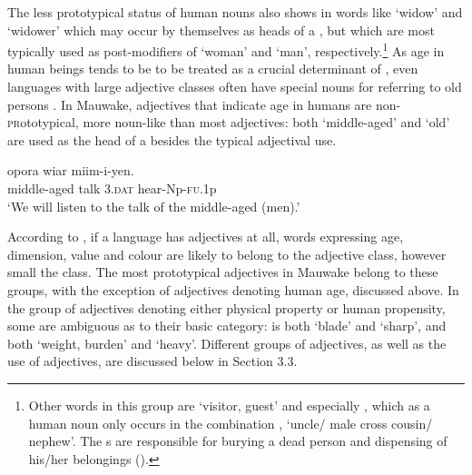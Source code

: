 The less prototypical status of human nouns also shows in words like  `widow' and  `widower' which may occur by themselves as heads of a , but which are most typically used as post-modifiers of  `woman' and  `man', respectively.\footnote{Other words in this group are \textbf{\textit{} }`visitor, guest' and especially , which as a human noun only occurs in the combination , `uncle/ male cross cousin/ nephew'. The s are responsible for burying a dead person and dispensing of his/her belongings ().} As age in human beings tends to be to be treated as a crucial determinant of , even languages with large adjective classes often have special nouns for referring to old persons \citep[368]{Wierzbicka1986}. In Mauwake, adjectives that indicate age in humans are non-\textsc{pr}ototypical, more noun-like than most adjectives: both  `middle-aged' and  `old' are used as the head of a  besides the typical adjectival use.

\ea%
\label{ex:3:x25}
\gll {} opora wiar miim-i-yen. \\
middle-aged talk 3.\textsc{dat} hear-Np-\textsc{fu}.1p\\
\glt`We will listen to the talk of the middle-aged (men).'
\z

According to \citet[56]{Dixon1977}, if a language has adjectives at all, words expressing age, dimension, value and colour are likely to belong to the adjective class, however small the class. The most prototypical adjectives in Mauwake belong to these groups, with the exception of adjectives denoting human age, discussed above. In the group of adjectives denoting either physical property or human propensity, some are ambiguous as to their basic category:  is both `blade' and `sharp', and  both `weight, burden' and `heavy'. Different groups of adjectives, as well as the use of adjectives, are discussed below in Section 3.3.

